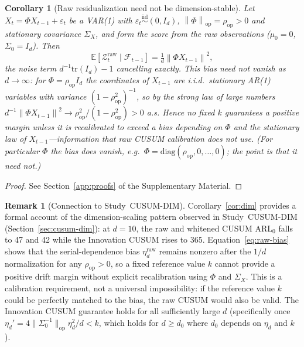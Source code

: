 \documentclass[bj,authoryear]{imsart}
\theoremstyle{plain}
\newtheorem{corollary}[theorem]{Corollary}
\theoremstyle{definition}
\newtheorem{remark}{Remark}[section]
\newcommand{\E}{\mathbb{E}}
\newcommand{\F}{\mathcal{F}}
\newcommand{\norm}[1]{\left\lVert #1 \right\rVert}
\newcommand{\given}{\mid}
\newcommand{\iid}{\overset{\mathrm{iid}}{\sim}}
\begin{document}
\begin{corollary}[Raw residualization need not be dimension-stable]
\label{cor:dim-raw}
  Let $X_t=\Phi X_{t-1}+\varepsilon_t$ be a VAR(1) with
  $\varepsilon_t\iid(0,I_d)$, $\norm{\Phi}_{\mathrm{op}}=\rho_{\mathrm{op}}>0$
  and stationary covariance $\Sigma_X$, and form the score from the raw
  observations ($\mu_0=0$, $\Sigma_0=I_d$).  Then
  \begin{equation}
    \E[\mathcal Z_t^{\mathrm{raw}}\given\F_{t-1}]
      =\tfrac1d\norm{\Phi X_{t-1}}^2,
    \label{eq:raw-bias}
  \end{equation}
  the noise term $d^{-1}\mathrm{tr}(I_d)-1$ cancelling exactly.  This bias need
  not vanish as $d\to\infty$: for $\Phi=\rho_{\mathrm{op}}I_d$ the coordinates of
  $X_{t-1}$ are i.i.d.\ stationary AR(1) variables with variance
  $(1-\rho_{\mathrm{op}}^2)^{-1}$, so by the strong law of large numbers
  $d^{-1}\norm{\Phi X_{t-1}}^2\to\rho_{\mathrm{op}}^2/(1-\rho_{\mathrm{op}}^2)>0$
  a.s.  Hence no fixed $k$
  guarantees a positive margin unless it is recalibrated to exceed a bias
  depending on $\Phi$ and the stationary law of $X_{t-1}$---information that raw
  CUSUM calibration does not use.  (For particular $\Phi$ the bias does vanish,
  e.g.\ $\Phi=\mathrm{diag}(\rho_{\mathrm{op}},0,\ldots,0)$; the point is that it
  need not.)
\end{corollary}


\begin{proof}
  See Section~\ref{app:proofs} of the Supplementary Material.
\end{proof}

\begin{remark}[Connection to Study~CUSUM-DIM]
  Corollary~\ref{cor:dim} provides a formal account of the
  dimension-scaling pattern observed in Study~CUSUM-DIM
  (Section~\ref{sec:cusum-dim}): at $d=10$, the raw and whitened CUSUM
  ARL$_0$ falls to 47 and 42 while the Innovation CUSUM rises to 365.
  Equation~\eqref{eq:raw-bias} shows that the serial-dependence bias
  $\eta_d^{\mathrm{raw}}$ remains nonzero after the $1/d$ normalization
  for any $\rho_{\mathrm{op}}>0$, so a fixed reference value $k$ cannot
  provide a positive drift margin without explicit recalibration using
  $\Phi$ and $\Sigma_X$.  This is a calibration requirement, not a
  universal impossibility: if the reference value $k$ could be perfectly
  matched to the bias, the raw CUSUM would also be valid.
  The Innovation CUSUM guarantee holds for all sufficiently large $d$
  (specifically once $\eta_d'=4\|\Sigma_0^{-1}\|_{\mathrm{op}}\eta_d^2/d<k$,
  which holds for $d\geq d_0$ where $d_0$ depends on $\eta_d$ and $k$).
\end{remark}
\end{document}
